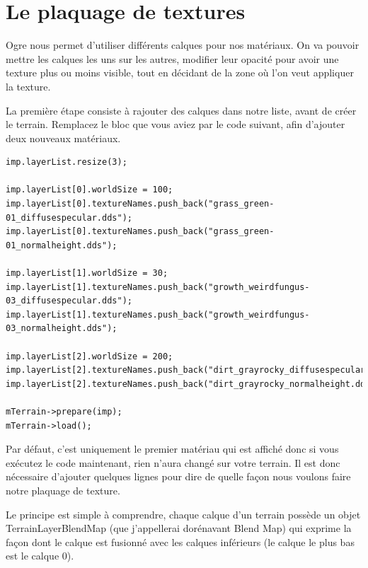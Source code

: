

\section{Le plaquage de textures}


Ogre nous permet d'utiliser diff\'erents calques pour nos mat\'eriaux. On va pouvoir mettre les calques les uns sur les autres, modifier leur opacit\'e pour avoir une texture plus ou moins visible, tout en d\'ecidant de la zone o\`u l'on veut appliquer la texture.

La premi\`ere \'etape consiste \`a rajouter des calques dans notre liste, avant de cr\'eer le terrain. Remplacez le bloc que vous aviez par le code suivant, afin d'ajouter deux nouveaux mat\'eriaux.



\begin{lstlisting}[caption={Ajout de calques}]
imp.layerList.resize(3);

imp.layerList[0].worldSize = 100;
imp.layerList[0].textureNames.push_back("grass_green-01_diffusespecular.dds");
imp.layerList[0].textureNames.push_back("grass_green-01_normalheight.dds");

imp.layerList[1].worldSize = 30;
imp.layerList[1].textureNames.push_back("growth_weirdfungus-03_diffusespecular.dds");
imp.layerList[1].textureNames.push_back("growth_weirdfungus-03_normalheight.dds");

imp.layerList[2].worldSize = 200;
imp.layerList[2].textureNames.push_back("dirt_grayrocky_diffusespecular.dds");
imp.layerList[2].textureNames.push_back("dirt_grayrocky_normalheight.dds");

mTerrain->prepare(imp);
mTerrain->load();
\end{lstlisting}

Par d\'efaut, c'est uniquement le premier mat\'eriau qui est affich\'e donc si vous ex\'ecutez le code maintenant, rien n'aura chang\'e sur votre terrain.  Il est donc n\'ecessaire d'ajouter quelques lignes pour dire de quelle fa\c{c}on nous voulons faire notre plaquage de texture.\newline

Le principe est simple \`a comprendre, chaque calque d'un terrain poss\`ede un objet TerrainLayerBlendMap (que j'appellerai dor\'enavant Blend Map) qui exprime la fa\c{c}on dont le calque est fusionn\'e avec les calques inf\'erieurs (le calque le plus bas est le calque 0).

